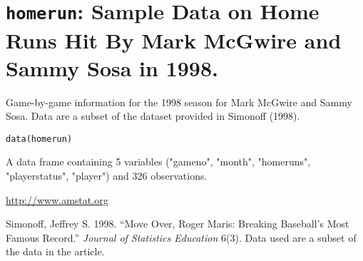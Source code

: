  \section{{\tt homerun}: Sample Data on Home Runs Hit By Mark McGwire and Sammy Sosa in 1998.}\label{ss:homerun}
\begin{Description}\relax
Game-by-game information for the 1998 season for Mark McGwire and Sammy Sosa. Data are a subset of the dataset provided in Simonoff (1998).
\end{Description}
\begin{Usage}
\begin{verbatim}data(homerun)\end{verbatim}
\end{Usage}
\begin{Format}\relax
A data frame containing 5 variables ("gameno", "month", "homeruns", "playerstatus", "player") and 326 observations.  
\end{Format}
\begin{Source}\relax
\url{http://www.amstat.org}
\end{Source}
\begin{References}\relax
Simonoff, Jeffrey S. 1998. ``Move Over, Roger Maris: Breaking Baseball's Most Famous Record.'' \emph{Journal of Statistics Education} 6(3). Data used are a subset of the data in the article.
\end{References}


